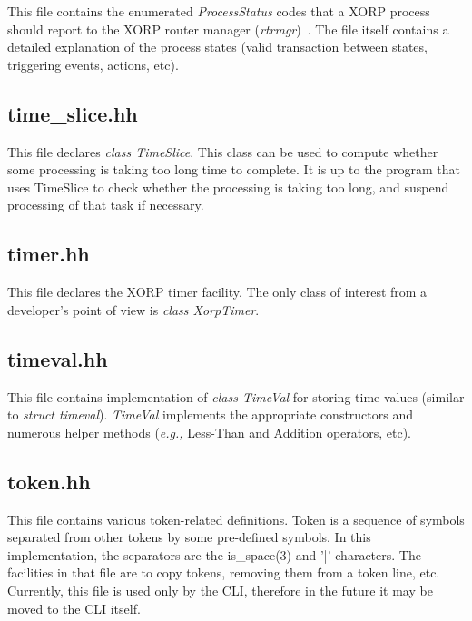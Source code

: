 \documentclass[11pt]{article}
\newcommand{\eg}{\emph{e.g.,}\xspace}
\begin{document}
This file contains the enumerated \emph{ProcessStatus} codes
that a XORP process should report to the XORP router manager
(\emph{rtrmgr})~\cite{xorp:rtrmgr}.
The file itself contains a detailed explanation of the process states
(valid transaction between states, triggering events, actions, etc).

\subsection{time\_slice.hh}

This file declares \emph{class TimeSlice}.
This class can be used to compute whether some processing is taking
too long time to complete. It is up to the program that uses
TimeSlice to check whether the processing is taking too long,
and suspend processing of that task if necessary.

\subsection{timer.hh}

This file declares the XORP timer facility. The only class of interest
from a developer's point of view is \emph{class XorpTimer}.

\subsection{timeval.hh}

This file contains implementation of \emph{class TimeVal} for
storing time values (similar to \emph{struct timeval}).
\emph{TimeVal} implements the appropriate constructors and numerous
helper methods (\eg Less-Than and Addition operators, etc).

\subsection{token.hh}

This file contains various token-related definitions. Token is a
sequence of symbols separated from other tokens by some pre-defined
symbols. In this implementation, the separators are the is\_space(3) and
'|' characters.
The facilities in that file are to copy tokens, removing them from a
token line, etc.
Currently, this file is used only by the CLI, therefore in the future it
may be moved to the CLI itself.
\end{document}
